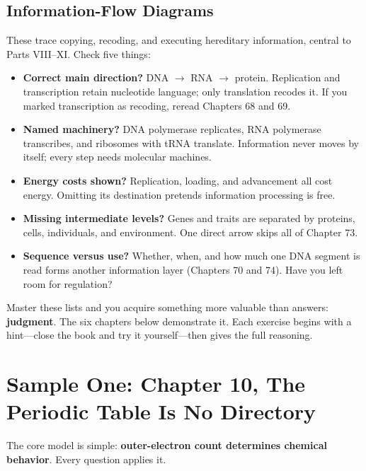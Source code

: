 \subsection{Information-Flow Diagrams}

These trace copying, recoding, and executing hereditary information, central to Parts VIII--XI. Check five things:

\begin{itemize}[itemsep=2pt]
\item \textbf{Correct main direction?} DNA $\rightarrow$ RNA $\rightarrow$ protein. Replication and transcription retain nucleotide language; only translation recodes it. If you marked transcription as recoding, reread Chapters 68 and 69.
\item \textbf{Named machinery?} DNA polymerase replicates, RNA polymerase transcribes, and ribosomes with tRNA translate. Information never moves by itself; every step needs molecular machines.
\item \textbf{Energy costs shown?} Replication, loading, and advancement all cost energy. Omitting its destination pretends information processing is free.
\item \textbf{Missing intermediate levels?} Genes and traits are separated by proteins, cells, individuals, and environment. One direct arrow skips all of Chapter 73.
\item \textbf{Sequence versus use?} Whether, when, and how much one DNA segment is read forms another information layer (Chapters 70 and 74). Have you left room for regulation?
\end{itemize}

Master these lists and you acquire something more valuable than answers: \textbf{judgment}. The six chapters below demonstrate it. Each exercise begins with a hint---close the book and try it yourself---then gives the full reasoning.

\section{Sample One: Chapter 10, The Periodic Table Is No Directory}

The core model is simple: \textbf{outer-electron count determines chemical behavior}. Every question applies it.

